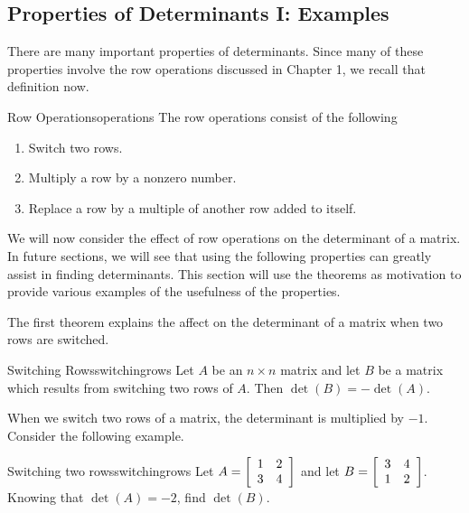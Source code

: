 \subsection{Properties of Determinants I: Examples}

There are many important properties of determinants. Since many of these properties involve
the row operations discussed in Chapter 1, we recall that definition now. 

\begin{definition}{Row Operations}{operations}
The row operations
consist of the following

\begin{enumerate}
\item Switch two rows.

\item Multiply a row by a nonzero number.

\item Replace a row by a multiple of another row added to itself.
\end{enumerate}
\end{definition}

We will now consider the effect of row operations on the determinant of a matrix. In future sections, we will see that using the following properties can 
greatly assist in finding determinants. This section will use the theorems as motivation to provide various examples of the usefulness of the properties. 

The first theorem explains the affect on the determinant of a matrix when two rows are switched. 

\begin{theorem}{Switching Rows}{switchingrows}
Let $A$ be an $n\times n$ matrix and let $B$ be a matrix
which results from switching two rows of $A.$ Then $\det \left( B\right)
= - \det \left( A\right) .$ 
\end{theorem}

When we switch two rows of a matrix, the determinant is multiplied by $-1$. Consider the following example.

\begin{example}{Switching two rows}{switchingrows}
Let $A=\left[
\begin{array}{rr}
1 & 2 \\
3 & 4
\end{array}
\right] $ and let $B=\left[
\begin{array}{rr}
3 & 4 \\
1 & 2
\end{array}
\right] $. 
Knowing that $\det \left( A \right) =-2$, find $\det \left( B \right) $.
\end{example}

